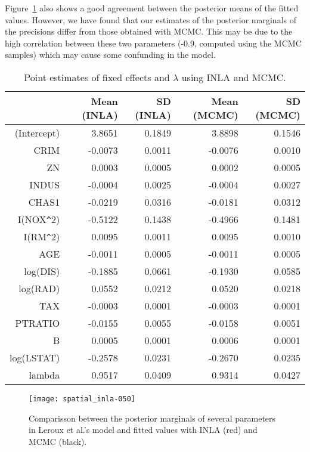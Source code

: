 \documentclass[article]{jss}
\begin{document}
Figure~\ref{fig:leroux} also shows a good agreement between the posterior
means of the fitted values. However, we have found that our estimates
of the posterior marginals of the precisions differ from those obtained
with MCMC. This may be due to the high correlation between these two parameters
(-0.9, computed using the MCMC samples) which may cause some confunding in the
model.

\begin{table}[ht]
\centering
\begin{tabular}{rrrrr}
  \hline
 & Mean (INLA) & SD (INLA) & Mean (MCMC) & SD (MCMC) \\ 
  \hline
(Intercept) & 3.8651 & 0.1849 & 3.8898 & 0.1546 \\ 
  CRIM & -0.0073 & 0.0011 & -0.0076 & 0.0010 \\ 
  ZN & 0.0003 & 0.0005 & 0.0002 & 0.0005 \\ 
  INDUS & -0.0004 & 0.0025 & -0.0004 & 0.0027 \\ 
  CHAS1 & -0.0219 & 0.0316 & -0.0181 & 0.0312 \\ 
  I(NOX\verb|^|2) & -0.5122 & 0.1438 & -0.4966 & 0.1481 \\ 
  I(RM\verb|^|2) & 0.0095 & 0.0011 & 0.0095 & 0.0010 \\ 
  AGE & -0.0011 & 0.0005 & -0.0011 & 0.0005 \\ 
  log(DIS) & -0.1885 & 0.0661 & -0.1930 & 0.0585 \\ 
  log(RAD) & 0.0552 & 0.0212 & 0.0520 & 0.0218 \\ 
  TAX & -0.0003 & 0.0001 & -0.0003 & 0.0001 \\ 
  PTRATIO & -0.0155 & 0.0055 & -0.0158 & 0.0051 \\ 
  B & 0.0005 & 0.0001 & 0.0006 & 0.0001 \\ 
  log(LSTAT) & -0.2578 & 0.0231 & -0.2670 & 0.0235 \\ 
  lambda & 0.9517 & 0.0409 & 0.9314 & 0.0427 \\ 
   \hline
\end{tabular}
\caption{Point estimates of fixed effects and $\lambda$ using INLA and MCMC.} 
\label{tab:leroux}
\end{table}

\begin{figure}[h]
\begin{center}
\texttt{[image: spatial\_inla-050]}
\end{center}
\caption{Comparisson between the posterior marginals of several parameters in 
Leroux et al.'s model and fitted values with INLA (red) and MCMC (black).}
\label{fig:leroux}
\end{figure}
\end{document}
